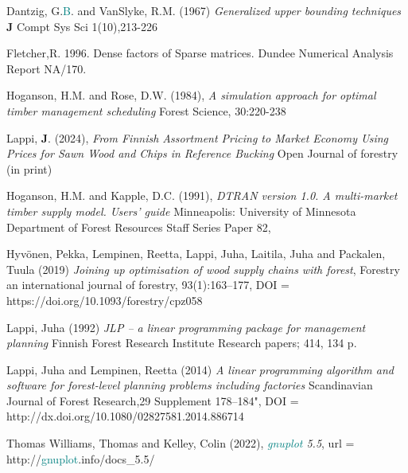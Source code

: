 \begin{thebibliography}{9} 
 
Dantzig, G.\textcolor{teal}{B}. and VanSlyke, R.M.  (1967) 
\emph{Generalized upper bounding techniques} 
\textbf{J} Compt Sys Sci 1(10),213-226 
 
Fletcher,R.  1996. Dense factors of Sparse matrices. Dundee 
Numerical Analysis Report NA/170. 
 
 
Hoganson, H.M. and Rose, D.W.  (1984), 
\emph{A simulation approach for optimal timber management scheduling} 
Forest Science, 30:220-238 
 
Lappi, \textbf{J}.  (2024), 
\emph{From Finnish Assortment Pricing to Market 
Economy Using Prices for Sawn Wood and 
Chips in Reference Bucking } 
Open Journal of forestry (in print) 
 
Hoganson, H.M. and Kapple,  D.C. (1991), 
\emph{DTRAN version 1.0. A multi-market timber supply model. Users’ guide} 
Minneapolis: University of Minnesota Department of Forest 
Resources Staff Series Paper 82, 
 
Hyv\"onen, Pekka, Lempinen, Reetta, 
Lappi, Juha, Laitila, Juha  and Packalen, Tuula (2019) 
\emph{Joining up optimisation of wood supply chains with forest}, 
Forestry an international journal of forestry, 
93(1):163--177, 
DOI = https://doi.org/10.1093/forestry/cpz058 
 
 Lappi, Juha (1992) \emph{JLP -- a linear programming package for 
management planning} Finnish Forest Research Institute 
Research papers; 414, 134 p. 
 
 
 
Lappi, Juha and Lempinen, Reetta (2014) 
\emph{A linear programming algorithm and software 
for forest-level planning problems 
including factories} 
Scandinavian Journal of Forest Research,29 Supplement 178--184", 
DOI =  http://dx.doi.org/10.1080/02827581.2014.886714 
 
Thomas Williams, Thomas and Kelley, Colin (2022), 
\emph{\textcolor{teal}{gnuplot} 5.5}, 
url = http://\textcolor{teal}{gnuplot}.info/docs\_5.5/ 
 
 
 
 
 
 
\end{thebibliography} 
